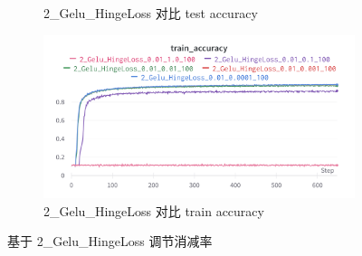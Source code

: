 \documentclass{article}
\begin{document}
\begin{figure}[htbp]
\begin{subfigure}{0.475\textwidth}
		\caption{2\_Gelu\_HingeLoss 对比 test accuracy}
	\end{subfigure}
	\begin{subfigure}{0.475\textwidth}
		\centering
		\includegraphics[width=1\textwidth]{../pics/消减率_2_Gelu_HingeLoss_train_acc.png}
		\caption{2\_Gelu\_HingeLoss  对比 train accuracy}
	\end{subfigure}
	\caption{基于 2\_Gelu\_HingeLoss  调节消减率}
	\label{fig:9}
\end{figure}
\end{document}

